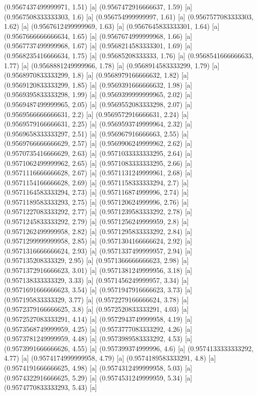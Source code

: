 {{{(0.9567437499999971, 1.51) [a] 
(0.9567472916666637, 1.59) [a] 
(0.9567508333333303, 1.6) [a] 
(0.956754999999997, 1.61) [a] 
(0.9567577083333303, 1.62) [a] 
(0.9567612499999969, 1.63) [a] 
(0.9567645833333301, 1.64) [a] 
(0.9567666666666634, 1.65) [a] 
(0.9567674999999968, 1.66) [a] 
(0.9567737499999968, 1.67) [a] 
(0.9568214583333301, 1.69) [a] 
(0.9568235416666634, 1.75) [a] 
(0.95685208333333, 1.76) [a] 
(0.9568541666666633, 1.77) [a] 
(0.9568881249999966, 1.78) [a] 
(0.9568914583333299, 1.79) [a] 
(0.9568970833333299, 1.8) [a] 
(0.9568979166666632, 1.82) [a] 
(0.9569120833333299, 1.85) [a] 
(0.9569391666666632, 1.98) [a] 
(0.9569395833333298, 1.99) [a] 
(0.9569399999999965, 2.02) [a] 
(0.9569487499999965, 2.05) [a] 
(0.9569552083333298, 2.07) [a] 
(0.9569566666666631, 2.2) [a] 
(0.9569572916666631, 2.24) [a] 
(0.9569579166666631, 2.25) [a] 
(0.9569593749999964, 2.32) [a] 
(0.9569658333333297, 2.51) [a] 
(0.956967916666663, 2.55) [a] 
(0.9569766666666629, 2.57) [a] 
(0.9569906249999962, 2.62) [a] 
(0.9570735416666629, 2.63) [a] 
(0.9571033333333295, 2.64) [a] 
(0.9571062499999962, 2.65) [a] 
(0.9571083333333295, 2.66) [a] 
(0.9571116666666628, 2.67) [a] 
(0.9571131249999961, 2.68) [a] 
(0.9571154166666628, 2.69) [a] 
(0.9571158333333294, 2.7) [a] 
(0.9571164583333294, 2.73) [a] 
(0.957116874999996, 2.74) [a] 
(0.9571189583333293, 2.75) [a] 
(0.957120624999996, 2.76) [a] 
(0.9571227083333292, 2.77) [a] 
(0.9571239583333292, 2.78) [a] 
(0.9571245833333292, 2.79) [a] 
(0.9571256249999959, 2.8) [a] 
(0.9571262499999958, 2.82) [a] 
(0.9571295833333292, 2.84) [a] 
(0.9571299999999958, 2.85) [a] 
(0.9571304166666624, 2.92) [a] 
(0.9571316666666624, 2.93) [a] 
(0.9571337499999957, 2.94) [a] 
(0.957135208333329, 2.95) [a] 
(0.9571366666666623, 2.98) [a] 
(0.9571372916666623, 3.01) [a] 
(0.9571381249999956, 3.18) [a] 
(0.957138333333329, 3.33) [a] 
(0.9571456249999957, 3.34) [a] 
(0.9571691666666623, 3.54) [a] 
(0.9571947916666623, 3.73) [a] 
(0.957195833333329, 3.77) [a] 
(0.9572279166666624, 3.78) [a] 
(0.9572379166666625, 3.8) [a] 
(0.9572520833333291, 4.03) [a] 
(0.9572527083333291, 4.14) [a] 
(0.9572943749999958, 4.19) [a] 
(0.9573568749999959, 4.25) [a] 
(0.9573777083333292, 4.26) [a] 
(0.9573781249999959, 4.48) [a] 
(0.9573989583333292, 4.53) [a] 
(0.9573991666666626, 4.55) [a] 
(0.957399374999996, 4.6) [a] 
(0.9574133333333292, 4.77) [a] 
(0.9574174999999958, 4.79) [a] 
(0.9574189583333291, 4.8) [a] 
(0.9574191666666625, 4.98) [a] 
(0.9574312499999958, 5.03) [a] 
(0.9574322916666625, 5.29) [a] 
(0.9574531249999959, 5.34) [a] 
(0.9574770833333293, 5.43) [a] 
}}}
